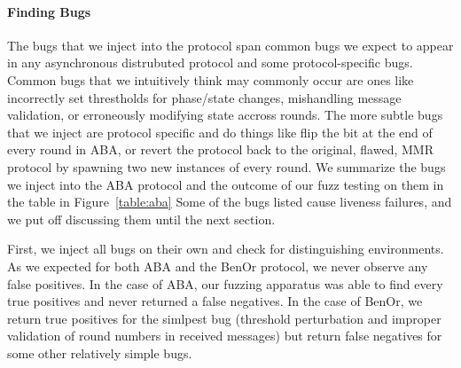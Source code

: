 \paragraph{Finding Bugs}
The bugs that we inject into the protocol span common bugs we expect to appear in any asynchronous distrubuted protocol and some protocol-specific bugs.
Common bugs that we intuitively think may commonly occur are ones like incorrectly set threstholds for phase/state changes, mishandling message validation, or erroneously modifying state accross rounds.
The more subtle bugs that we inject are protocol specific and do things like flip the  bit at the end of every round in ABA, or revert the protocol back to the original, flawed, MMR protocol by spawning two new instances of  every round.
We summarize the bugs we inject into the ABA protocol and the outcome of our fuzz testing on them in the table in Figure~\ref{table:aba}
Some of the bugs listed cause liveness failures, and we put off discussing them until the next section.

First, we inject all bugs on their own and check for distinguishing environments.
As we expected for both ABA and the BenOr protocol, we never observe any false positives.
In the case of ABA, our fuzzing apparatus was able to find every true positives and never returned a false negatives.
In the case of BenOr, we return true positives for the simlpest bug (threshold perturbation and improper validation of round numbers in received messages) but return false negatives for some other relatively simple bugs.

